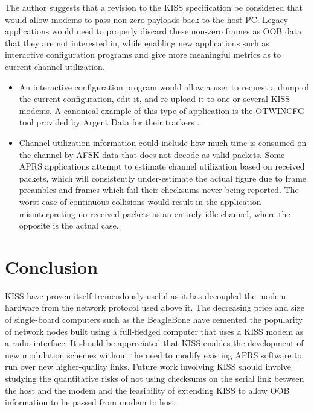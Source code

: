 The author suggests that a revision to the KISS specification be considered
that would allow modems to pass non-zero payloads back to the host PC.
Legacy applications would need to properly discard these non-zero frames
as OOB data that they are not interested in,
while enabling new applications such as interactive configuration programs
and give more meaningful metrics as to current channel utilization.
\begin{itemize}
	\item An interactive configuration program would allow a user
		to request a dump of the current configuration, edit it, and
		re-upload it to one or several KISS modems. A canonical example
		of this type of application is the OTWINCFG tool 
		provided by Argent Data for their trackers \cite[\S17.6]{ot3manual}.
	\item Channel utilization information could include how much time
		is consumed on the channel by AFSK data that does not decode as
		valid packets. Some APRS applications attempt to estimate channel
		utilization based on received packets, which will consistently
		under-estimate the actual figure due to frame preambles
		and frames which fail their checksums never being reported.
		The worst case of continuous collisions would result in
		the application misinterpreting no received packets as
		an entirely idle channel, where the opposite is the actual case.
\end{itemize}

\section{Conclusion}

KISS have proven itself tremendously useful as it has decoupled the modem
hardware from the network protocol used above it.
The decreasing price and size of single-board computers such as the
BeagleBone have cemented the popularity of network nodes built using
a full-fledged computer that uses a KISS modem as a radio interface.
It should be appreciated that KISS enables the development of new
modulation schemes without the need to modify existing APRS software
to run over new higher-quality links.
Future work involving KISS should involve studying the quantitative risks
of not using checksums on the serial link between the host and the modem
and the feasibility of extending KISS to allow OOB information to be passed
from modem to host.

